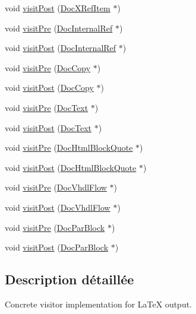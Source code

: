 \begin{DoxyCompactItemize}
\item 
void \hyperlink{class_man_doc_visitor_aeed551e6afa76454fe45e68769c9d965}{visit\+Post} (\hyperlink{class_doc_x_ref_item}{Doc\+X\+Ref\+Item} $\ast$)
\item 
void \hyperlink{class_man_doc_visitor_a45ad4c012145d919e785d10daa880da4}{visit\+Pre} (\hyperlink{class_doc_internal_ref}{Doc\+Internal\+Ref} $\ast$)
\item 
void \hyperlink{class_man_doc_visitor_aba4c6213fafad743bf58742414556f88}{visit\+Post} (\hyperlink{class_doc_internal_ref}{Doc\+Internal\+Ref} $\ast$)
\item 
void \hyperlink{class_man_doc_visitor_a7a2c07fc6eb2758e3b6cac3c0953cf7d}{visit\+Pre} (\hyperlink{class_doc_copy}{Doc\+Copy} $\ast$)
\item 
void \hyperlink{class_man_doc_visitor_a64e6f650bcce8563e70be8c9072108e9}{visit\+Post} (\hyperlink{class_doc_copy}{Doc\+Copy} $\ast$)
\item 
void \hyperlink{class_man_doc_visitor_a55128e98164691660adaf300a6a9effb}{visit\+Pre} (\hyperlink{class_doc_text}{Doc\+Text} $\ast$)
\item 
void \hyperlink{class_man_doc_visitor_a76585807b1ac81db6d94cf6d171560cd}{visit\+Post} (\hyperlink{class_doc_text}{Doc\+Text} $\ast$)
\item 
void \hyperlink{class_man_doc_visitor_ab5a49aa7990e8757a4df8a4d82662000}{visit\+Pre} (\hyperlink{class_doc_html_block_quote}{Doc\+Html\+Block\+Quote} $\ast$)
\item 
void \hyperlink{class_man_doc_visitor_a7a99dae6fc5666af71794a8c420218c3}{visit\+Post} (\hyperlink{class_doc_html_block_quote}{Doc\+Html\+Block\+Quote} $\ast$)
\item 
void \hyperlink{class_man_doc_visitor_a40e8d9cb775cc4839e0174c0aad63a4e}{visit\+Pre} (\hyperlink{class_doc_vhdl_flow}{Doc\+Vhdl\+Flow} $\ast$)
\item 
void \hyperlink{class_man_doc_visitor_aa729c8275c30fb7884067d5b1f6c3616}{visit\+Post} (\hyperlink{class_doc_vhdl_flow}{Doc\+Vhdl\+Flow} $\ast$)
\item 
void \hyperlink{class_man_doc_visitor_ab76fde41ae4ca2617f4aa20b4f1f05fb}{visit\+Pre} (\hyperlink{class_doc_par_block}{Doc\+Par\+Block} $\ast$)
\item 
void \hyperlink{class_man_doc_visitor_a7b079cb244b1a4c8491e65946fda0039}{visit\+Post} (\hyperlink{class_doc_par_block}{Doc\+Par\+Block} $\ast$)
\end{DoxyCompactItemize}


\subsection{Description détaillée}
Concrete visitor implementation for La\+Te\+X output. 

